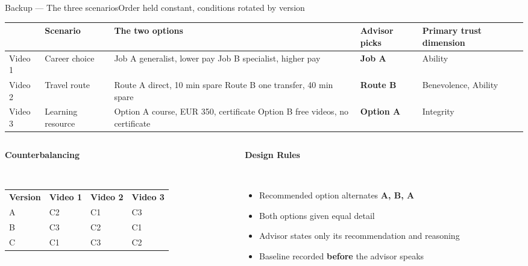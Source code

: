 \documentclass[aspectratio=169,10pt]{beamer}
\newcommand{\hl}[1]{{\color{knblue}\textbf{#1}}}
\newcommand{\panelhead}[1]{\noindent\colorbox{kncyan}{\parbox{0.96\textwidth}{\centering\vspace{1pt}\color{white}\scriptsize\bfseries #1\vspace{1pt}}}\\[0.25em]}
\newcommand{\panel}[1]{\noindent\colorbox{knlight}{\parbox{0.96\textwidth}{\vspace{2pt}\scriptsize
\begin{itemize}\setlength{\itemsep}{0.2em}\setlength{\leftmargini}{1.1em}#1\end{itemize}\vspace{2pt}}}}
\newcommand{\rowrule}{\noalign{\vskip1pt}\arrayrulecolor{black!12}\hline\arrayrulecolor{black}\noalign{\vskip1pt}}
\begin{document}
\begin{frame}{Backup — The three scenarios}{Order held constant, conditions rotated by version}
  \vspace{0.3em}
  {\centering\scriptsize
  \setlength{\tabcolsep}{5pt}\renewcommand{\arraystretch}{1.2}
  \begin{tabular}{@{}>{\raggedright\arraybackslash}m{}>{\raggedright\arraybackslash}m{}>{\raggedright\arraybackslash}m{}>{\raggedright\arraybackslash}m{}>{\raggedright\arraybackslash}m{}@{}}
    \toprule
    & \textbf{Scenario} & \textbf{The two options} & \textbf{Advisor picks} & \textbf{Primary trust dimension} \\
    \midrule
    Video 1 & Career choice    & Job A generalist, lower pay \newline Job B specialist, higher pay      & \hl{Job A}    & Ability \\
    \rowrule
    Video 2 & Travel route     & Route A direct, 10 min spare \newline Route B one transfer, 40 min spare & \hl{Route B}  & Benevolence, Ability \\
    \rowrule
    Video 3 & Learning resource & Option A course, EUR 350, certificate \newline Option B free videos, no certificate & \hl{Option A} & Integrity \\
    \bottomrule
  \end{tabular}\par}
  \vspace{0.35em}

  \begin{columns}[T]
    \begin{column}{0.52\textwidth}
      \panelhead{Counterbalancing}
      \noindent\colorbox{knlight}{\parbox{0.96\textwidth}{\vspace{2pt}\scriptsize
      \setlength{\tabcolsep}{4pt}\renewcommand{\arraystretch}{1.25}
      \begin{tabular}{@{}llll@{}}
        \textbf{Version} & \textbf{Video 1} & \textbf{Video 2} & \textbf{Video 3} \\
        A & C2 & C1 & C3 \\
        B & C3 & C2 & C1 \\
        C & C1 & C3 & C2 \\
      \end{tabular}\vspace{2pt}}}
    \end{column}
    \begin{column}{0.44\textwidth}
      \panelhead{Design Rules}
      \panel{%
        \item Recommended option alternates \hl{A, B, A}
        \item Both options given equal detail
        \item Advisor states only its recommendation and reasoning
        \item Baseline recorded \hl{before} the advisor speaks}
    \end{column}
  \end{columns}
\end{frame}
\end{document}

